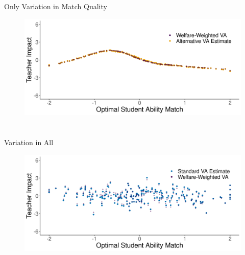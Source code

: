 \documentclass[11pt]{beamer}
\begin{document}

\section*{}
\begin{frame}[noframenumbering]{Only Variation in Match Quality}

\hypertarget{np_cent3}{}
\vfill

\begin{figure}
    \centering
 \includegraphics[width=.75\textwidth]{slides/Figures/np_welfare_cent_run_3.png}
\end{figure}

\hyperlink{match_quality2}{}

\end{frame}



\section*{}
\begin{frame}[noframenumbering]{Variation in All}

\hypertarget{st_cent4}{}
\vfill

\begin{figure}
    \centering
 \includegraphics[width=.75\textwidth]{slides/Figures/standard_est_cent_run_4.png}
\end{figure}

\hyperlink{all1}{}

\end{frame}
\end{document}
